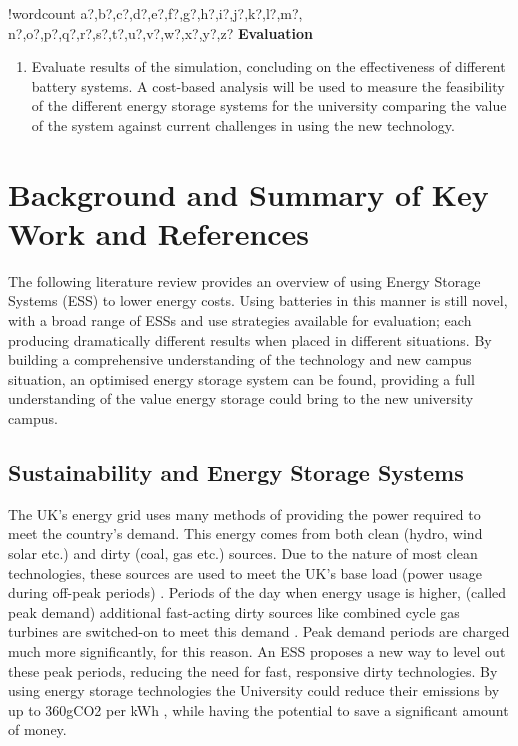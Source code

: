 \documentclass[fontsize=9.5pt]{extarticle}
\numberwithin{figure}{section} %
\newcounter{words}
\newenvironment{counted}{%
  \setcounter{words}{0}
  \SearchList!{wordcount}{\stepcounter{words}}
    {a?,b?,c?,d?,e?,f?,g?,h?,i?,j?,k?,l?,m?,
    n?,o?,p?,q?,r?,s?,t?,u?,v?,w?,x?,y?,z?}
  \UndoBoundary{'}
  \SearchOrder{p;}}{%
  \StopSearching}
\begin{document}
\begin{counted}
\textbf{Evaluation}

\begin{enumerate}[resume]
\item Evaluate results of the simulation, concluding on the effectiveness of different battery systems. A cost-based analysis will be used to measure the feasibility of the different energy storage systems for the university comparing the value of the system against current challenges in using the new technology.
\end{enumerate}

\section{Background and Summary of Key Work and
References}\label{background-and-summary-of-key-work-and-references}

The following literature review provides an overview of using Energy
Storage Systems (ESS) to lower energy costs. Using batteries in this
manner is still novel, with a broad range of ESSs and use strategies
available for evaluation; each producing dramatically different results
when placed in different situations. By building a comprehensive
understanding of the technology and new campus situation, an optimised
energy storage system can be found, providing a full understanding of
the value energy storage could bring to the new university campus.

\subsection{Sustainability and Energy Storage
Systems}\label{sustainability-and-energy-storage-systems}

The UK's energy grid uses many methods of providing the power required
to meet the country's demand. This energy comes from both clean (hydro,
wind solar etc.) and dirty (coal, gas etc.) sources. Due to the nature
of most clean technologies, these sources are used to meet the UK's base
load (power usage during off-peak periods) \cite{GBNation22:online}.
Periods of the day when energy usage is higher, (called peak demand)
additional fast-acting dirty sources like combined cycle gas turbines
are switched-on to meet this demand \cite{Reducing94:online}. Peak
demand periods are charged much more significantly, for this reason. An
ESS proposes a new way to level out these peak periods, reducing the
need for fast, responsive dirty technologies. By using energy storage
technologies the University could reduce their emissions by up to
360gCO2 per kWh \cite{Part1Att26:online}, while having the potential to
save a significant amount of money.


\end{counted}
\end{document}
